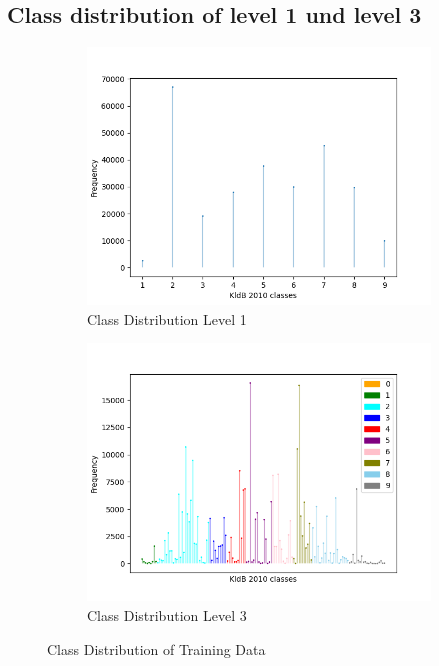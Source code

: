 \documentclass[12pt, a4paper, titlepage]{article}
\begin{document}
\subsection*{Class distribution of level 1 und level 3}
\begin{figure}[hb!]
  \begin{subfigure}{.5\textwidth}
    \centering
    \includegraphics[width=.9\linewidth]{training_data_long_L1.png}
    \caption{\label{fig: F11} Class Distribution Level 1}
  \end{subfigure}%
  \begin{subfigure}{.5\textwidth}
    \centering
    \includegraphics[width=.9\linewidth]{training_data_long_L3.png}
    \caption{\label{fig: F12} Class Distribution Level 3}
  \end{subfigure}
  \caption{Class Distribution of Training Data}
  \end{figure}
\end{document}
